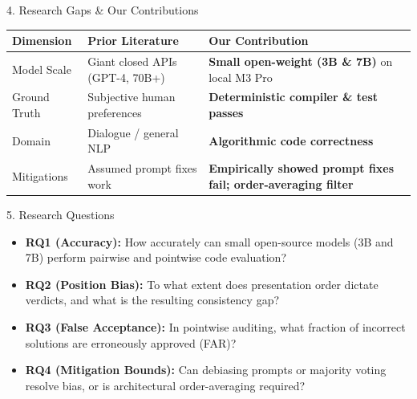 \documentclass[aspectratio=169]{beamer}
\begin{document}
\begin{frame}{4. Research Gaps \& Our Contributions}
  \begin{table}
    \centering
    \footnotesize
    \begin{tabular}{lll}
      \toprule
      \textbf{Dimension} & \textbf{Prior Literature} & \textbf{Our Contribution} \\
      \midrule
      Model Scale & Giant closed APIs (GPT-4, 70B+) & \textbf{Small open-weight (3B \& 7B)} on local M3 Pro \\
      Ground Truth & Subjective human preferences & \textbf{Deterministic compiler \& test passes} \\
      Domain & Dialogue / general NLP & \textbf{Algorithmic code correctness} \\
      Mitigations & Assumed prompt fixes work & \textbf{Empirically showed prompt fixes fail; order-averaging filter} \\
      \bottomrule
    \end{tabular}
  \end{table}
\end{frame}

\begin{frame}{5. Research Questions}
  \begin{itemize}
    \item \textbf{RQ1 (Accuracy):} How accurately can small open-source models (3B and 7B) perform pairwise and pointwise code evaluation?
    \item \textbf{RQ2 (Position Bias):} To what extent does presentation order dictate verdicts, and what is the resulting consistency gap?
    \item \textbf{RQ3 (False Acceptance):} In pointwise auditing, what fraction of incorrect solutions are erroneously approved (FAR)?
    \item \textbf{RQ4 (Mitigation Bounds):} Can debiasing prompts or majority voting resolve bias, or is architectural order-averaging required?
  \end{itemize}
\end{frame}
\end{document}
